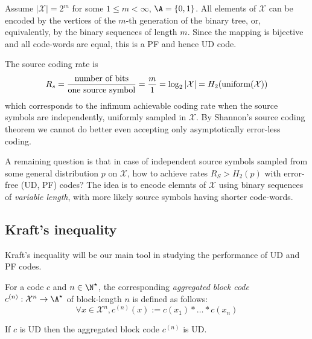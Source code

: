 \documentclass{../cs-classes/cs-classes}
\newcommand*{\X}{\mathcal{X}}
\begin{document}
\begin{example}
    Assume $|\X|=2^m$ for some $1\leq m<\infty$, $\A=\{0, 1\}$. All elements of $\X$ can be encoded by the vertices of the $m$-th generation of the binary tree, or, equivalently, by the binary sequences of length $m$.
    Since the mapping is bijective and all code-words are equal, this is a PF and hence UD code.

    The source coding rate is
    \begin{equation*}
        R_s=\frac{\textnormal{number of bits}}{\textnormal{one source symbol}} = \frac{m}{1} = \log_2|\X| = H_2(\textnormal{uniform}(\X))
    \end{equation*}
    which corresponds to the infimum achievable coding rate when the source symbols are independently, uniformly sampled in $\X$. By Shannon's source coding theorem we cannot do better even accepting only asymptotically error-less coding.
\end{example}

A remaining question is that in case of independent source symbols sampled from some general distribution $p$ on $\X$, how to achieve rates $R_S>H_2(p)$ with error-free (UD, PF) codes? The idea is to encode elemnts of $\X$ using binary sequences of \emph{variable length}, with more likely source symbols having shorter code-words.

\subsection{Kraft's inequality}
Kraft's inequality will be our main tool in studying the performance of UD and PF codes.

\begin{definition}
    For a code $c$ and $n\in \N^\star$, the corresponding \emph{aggregated block code} $c^{(n)} : \X^n\to \A^\star$ of block-length $n$ is defined as follows:
    \begin{equation*}
        \forall x\in \X^n, c^{(n)}(x) := c(x_1) * \dots * c(x_n)
    \end{equation*}
\end{definition}

\begin{lemma}
    If $c$ is UD then the aggregated block code $c^{(n)}$ is UD.
\end{lemma}

\end{document}
